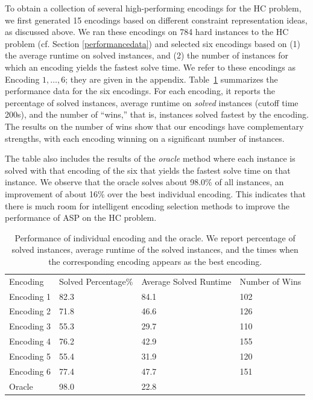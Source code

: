 \documentclass{new_tlp}
\begin{document}
To obtain a collection of several high-performing encodings for the HC 
problem, we first generated 15 encodings based on different constraint 
representation ideas, as discussed above. We ran these encodings on 784 
hard instances to the HC problem (cf. Section \ref{performancedata}) and selected six 
encodings based on (1) the average runtime on solved instances, and (2) 
the number of instances for which an encoding yields the fastest solve 
time. We refer to these encodings as Encoding $1,\ldots, 6$; they are 
given in the appendix. Table~\ref{encperform} summarizes the performance 
data for the six encodings. For each encoding, it
reports the percentage of solved instances, average runtime on \emph{solved} 
instances (cutoff time 200s), and the number of ``wins,'' that is, instances
solved fastest by the encoding. The results on the number of wins show that
our encodings have complementary strengths, with each encoding winning on a
significant number of instances.

The table also includes the results of the \emph{oracle} method where each 
instance is solved with that encoding of the six that yields the fastest 
solve time on that instance. We observe that the oracle solves about 98.0\%
of all instances, an improvement of about 16\% over the best individual 
encoding. This indicates that there is much room for intelligent encoding 
selection methods to improve the performance of ASP on the HC problem.

\begin{table}[]
	\caption{Performance of individual encoding and the oracle. We report percentage of solved instances, average runtime of the solved instances, and the times when the corresponding encoding appears as the best encoding.} \label{encperform}
	\programmath
	\begin{tabular}{llll}
		\hline \hline
		Encoding & Solved Percentage\% & Average Solved Runtime & Number of Wins\\
		Encoding 1     & 82.3             & 84.1              & 102                 \\
		Encoding 2     & 71.8            & 46.6             & 126                 \\
		Encoding 3     & 55.3             & 29.7              & 110                 \\
		Encoding 4     & 76.2             & 42.9              & 155                 \\
		Encoding 5     & 55.4             & 31.9              & 120                 \\
		Encoding 6     & 77.4             & 47.7             & 151                 \\
		Oracle   & 98.0            & 22.8              & \\
		\hline \hline                
	\end{tabular}
	\programmath
\end{table}
\end{document}
